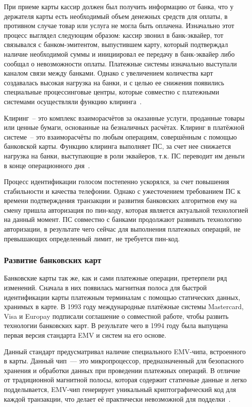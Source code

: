 При приеме карты кассир должен был получить информацию от банка, что у держателя карты есть необходимый объем денежных средств для оплаты, в противном случае товар или услуга не могла быть оплачена.
Изначально этот процесс выглядел следующим образом: кассир звонил в банк-эквайер, тот связывался с банком-эмитентом, выпустившем карту, который подтверждал наличие необходимой суммы и инициировал ее передачу в банк-эквайер либо сообщал о невозможности оплаты.
Платежные системы изначально выступали каналом связи между банками.
Однако с увеличением количества карт создавалась высокая нагрузка на банки, и с целью ее снижения появились специальные процессинговые центры, которые совместно с платежными системами осуществляли функцию клиринга~\cite{habr_fondy_payment_history}.

Клиринг~-- это комплекс взаиморасчётов за оказанные услуги, проданные товары или ценные бумаги, основанные на безналичных расчётах.
Клиринг в платёжной системе~-- это взаиморасчёты по любым операциям, совершённым с помощью банковской карты.
Функцию клиринга выполняет ПС, за счет нее снижается нагрузка на банки, выступающие в роли эквайеров, т.к. ПС переводит им деньги в конце операционного дня~\cite{habr_nspk_cliring}.

Процесс идентификации голосом постепенно ускорялся, за счет повышения стабильности и качества телефонии.
Однако с ужесточением требованием ПС к времени подтверждения транзакции и развития банковских алгоритмов ему на смену пришла авторизация по пин-коду, которая является актуальной технологией на данный момент.
ПС совместно с банками продолжают развивать технологию авторизации, в результате чего сейчас для выполнения платежных операций, не превышающих определенный лимит, не требуется пин-код.


\subsubsection{Развитие банковских карт}

Банковские карты так же, как и сами платежные операции, претерпели ряд изменений.
Сначала в них появилась магнитная полоса для быстрой идентификации карты платежным терминалам с помощью статических данных, хранимых в карте.
В 1993 году международные платёжные системы Mastercard, Visa и Europay подписали соглашение о совместной работе, чтобы развить технологии банковских карт.
В результате чего в 1994 году была выпущена первая версия стандарта EMV и систем на его основе.

Данный стандарт предусматривал наличие специального EMV-чипа, встроенного в карты.
Данный чип~--- это микропроцессор, предназначенный для безопасного хранения и обработки данных при проведении платежных операций.
В отличие от традиционной магнитной полосы, которая содержит статичные данные и легко подделывается, EMV-чип генерирует уникальный криптографический код для каждой транзакции, что делает её практически невозможной для подделки~\cite{emv_specifications_book}.

